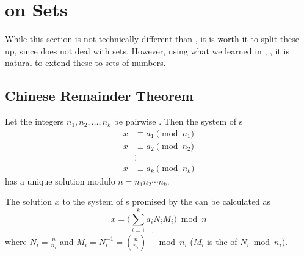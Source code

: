 \section{ on Sets}\label{sec:Number_Theory_on_Sets}
While this section is not technically different than , it is worth it to split these up, since  does not deal with sets.
However, using what we learned in , , it is natural to extend these to sets of numbers.





\subsection{Chinese Remainder Theorem}\label{subsec:Chinese_Remainder_Theorem}
\begin{theorem}\label{thm:Chinese_Remainder_Theorem}
  Let the integers $n_{1}, n_{2}, \ldots, n_{k}$ be pairwise .
  Then the system of s
  \begin{align*}
    x &\equiv a_{1} \pmod{n_{1}} \\
    x &\equiv a_{2} \pmod{n_{2}} \\
      &\vdots \\
    x &\equiv a_{k} \pmod{n_{k}}
  \end{align*}
  has a unique solution modulo $n = n_{1}n_{2} \cdots n_{k}$.
\end{theorem}

\begin{definition}\label{def:Gauss_Algorithm}
  The solution $x$ to the system of s promised by the  can be calculated as
  \begin{equation}\label{eq:Gauss_Algorithm}
    x = \Biggl( \sum\limits_{i=1}^{k}a_{i} N_{i} M_{i} \Biggr) \bmod n
  \end{equation}
  where $N_{i} = \frac{n}{n_{i}}$ and $M_{i} = N_{i}^{-1} = {\left( \frac{n}{n_{i}} \right)}^{-1} \bmod n_{i}$ ($M_{i}$ is the  of $N_{i} \bmod n_{i}$).
\end{definition}

